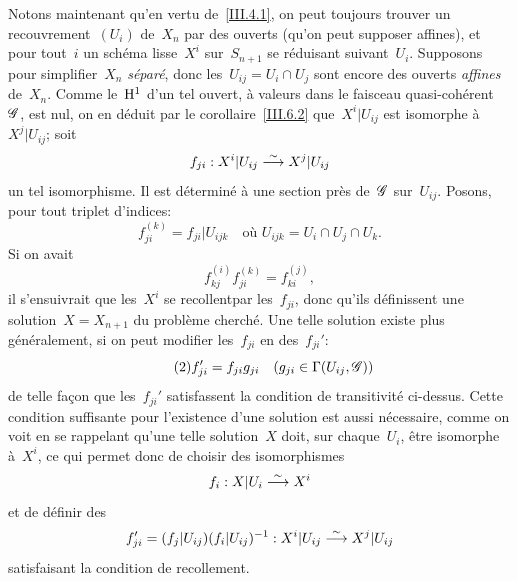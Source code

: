Notons maintenant qu'en vertu de~\ref{III.4.1}, on peut toujours
trouver un recouvrement~$(U_i)$
de~$X_n$ par des ouverts (qu'on peut supposer affines), et pour
tout~$i$ un sch\'ema lisse~$X^i$ sur~$S_{n+1}$ se r\'eduisant
suivant~$U_i$.
Supposons pour simplifier~$X_n$ \emph{séparé}, donc
les~$U_{ij}=U_i\cap U_j$ sont encore des ouverts \emph{affines}
de~$X_n$. Comme le~$\mathrm{H}^1$ d'un tel ouvert, \`a valeurs dans le
faisceau quasi-coh\'erent~$\cal{G}$, est nul, on en d\'eduit par
le
corollaire~\ref{III.6.2} que~$X^i|U_{ij}$ est isomorphe
\`a~$X^j|U_{ij}$; soit
$$
f_{ji}:X^i|U_{ij}\overset{\sim}{\longrightarrow} X^j|U_{ij}
$$
un tel isomorphisme. Il est d\'etermin\'e \`a une section
pr\`es de~$\cal{G}$ sur~$U_{ij}$. Posons, pour tout
triplet
d'indices:
$$
f_{ji}^{(k)}=f_{ji}|U_{ijk}\quad\text{où }U_{ijk}=U_i\cap U_j\cap
U_k.
$$
Si on avait
\begin{equation*}
\label{eq:III.6.1}
\tag{1} {f_{kj}^{(i)}f_{ji}^{(k)}=f_{ki}^{(j)},}
\end{equation*}
il s'ensuivrait que les~$X^i$ se \og recollent\fg par les~$f_{ji}$, donc
qu'ils d\'efinissent une solution~$X=X_{n+1}$ du probl\`eme
cherch\'e. Une telle solution existe plus g\'en\'eralement, si
on peut modifier les~$f_{ji}$ en des~$f_{ji}'$:
\begin{equation*}
\label{eq:III.6.2}
\tag{2} {f_{ji}'=f_{ji}g_{ji}\quad (g_{ji}\in\Gamma(U_{ij},\cal{G}))}
\end{equation*}
de telle fa\c con que les~$f_{ji}'$ satisfassent la condition de
transitivit\'e ci-dessus. Cette condition suffisante pour
l'existence d'une solution est aussi n\'ecessaire, comme on voit en
se rappelant qu'une telle solution~$X$ doit, sur chaque~$U_i$,
\^etre isomorphe \`a~$X^i$, ce qui permet donc de choisir des
isomorphismes
$$
f_i:X|U_i\overset{\sim}{\longrightarrow} X^i
$$
et de d\'efinir des
$$
f_{ji}'=(f_j|U_{ij})(f_i|U_{ij})^{-1}:X^i|U_{ij}\overset{\sim}{\longrightarrow} X^j|U_{ij}
$$
satisfaisant la condition de recollement.

